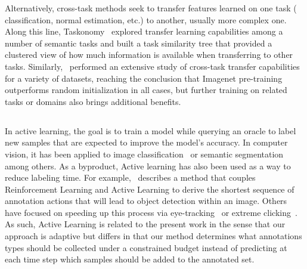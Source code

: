 Alternatively, cross-task methods seek to transfer features learned on one task (\eg~ classification, normal estimation, etc.) to another, usually more complex one. Along this line, Taskonomy~ explored transfer learning capabilities among a number of semantic tasks and built a task similarity tree that provided a clustered view of how much information is available when transferring to other tasks. Similarly,~ performed an extensive study of cross-task transfer capabilities for a variety of datasets, reaching the conclusion that Imagenet pre-training outperforms random initialization in all cases, but further training on related tasks or domains also brings additional benefits.

\subsection{}
In active learning, the goal is to train a model while querying an oracle to label new samples that are expected to improve the model's accuracy. In computer vision, it has been applied to image classification~ or semantic segmentation~ among others. As a byproduct, Active learning has also been used as a way to reduce labeling time. For example,~ describes a method that couples Reinforcement Learning and Active Learning to derive the shortest sequence of annotation actions that will lead to object detection within an image. Others have focused on speeding up this process via eye-tracking~ or extreme clicking~. As such, Active Learning is related to the present work in the sense that our approach is adaptive but differs in that our method determines what annotations types should be collected under a constrained budget instead of predicting at each time step which samples should be added to the annotated set.